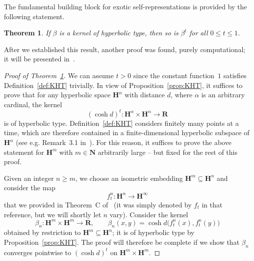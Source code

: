 \documentclass[11pt]{article}
\newtheorem{theorem}[theo]{Theorem}
\theoremstyle{definition}
\numberwithin{equation}{section}
\numberwithin{figure}{section}
\numberwithin{table}{section}
\newcommand{\RR}{\mathbf{R}}
\newcommand{\NN}{\mathbf{N}}
\newcommand{\HH}{\mathbf{H}}
\newcommand{\HHI}{\mathbf{H}^{\infty}}
\newcommand{\se}{\subseteq}
\newcommand{\lra}{\longrightarrow}
\begin{document}
The fundamental building block for exotic self-representations is provided by the following statement.

\begin{theorem}\label{thm:power}
If $\beta$ is a kernel of hyperbolic type, then so is $\beta^t$ for all $0\leq t\leq 1$.
\end{theorem}

After we established this result, another proof was found, purely computational; it will be presented in~\cite{MonodFHT_arx}.

\begin{proof}[Proof of Theorem~\ref{thm:power}]
We can assume $t>0$ since the constant function~$1$ satisfies Definition~\ref{def:KHT} trivially. In view of Proposition~\ref{prop:KHT}, it suffices to prove that for any hyperbolic space $\HH^\alpha$ with distance $d$, where $\alpha$ is an arbitrary cardinal, the kernel
\[
(\cosh d)^t\colon \HH^\alpha\times \HH^\alpha \lra \RR
\]
is of hyperbolic type. Definition~\ref{def:KHT} considers finitely many points at a time, which are therefore contained in a finite-dimensional hyperbolic subspace of $\HH^\alpha$ (see e.g. Remark~3.1 in~\cite{Burger-Iozzi-Monod}). For this reason, it suffices to prove the above statement for $\HH^m$ with $m\in \NN$ arbitrarily large -- but fixed for the rest of this proof.

Given an integer $n\geq m$, we choose an isometric embedding $\HH^m\se \HH^n$ and consider the map
\[
f^n_t\colon \HH^n \lra \HHI
\]
that we provided in Theorem~C of~\cite{Monod-Py} (it was simply denoted by $f_t$ in that reference, but we will shortly let $n$ vary). Consider the kernel
\[
\beta_n\colon \HH^m \times \HH^m \lra \RR, \qquad \beta_n(x,y) = \cosh d\big(f^n_t(x), f^n_t(y)\big)
\]
obtained by restriction to $\HH^m\se \HH^n$; it is of hyperbolic type by Proposition~\ref{prop:KHT}. The proof will therefore be complete if we show that $\beta_n$ converges pointwise to $(\cosh d)^t$ on $\HH^m \times \HH^m$.


\end{proof}
\end{document}
